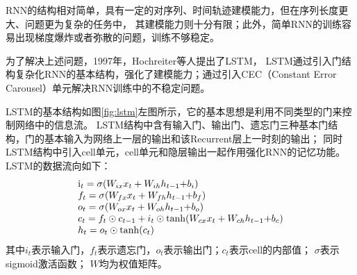 RNN的结构相对简单，具有一定的对序列、时间轨迹建模能力，但在序列长度更大、问题更为复杂的任务中，
其建模能力则十分有限；此外，简单RNN的训练容易出现梯度爆炸或者弥散的问题，训练不够稳定。

为了解决上述问题，1997年，Hochreiter等人提出了LSTM，
LSTM通过引入门结构复杂化RNN的基本结构，强化了建模能力；通过引入CEC（Constant Error Carousel）单元解决RNN训练中的不稳定问题。


LSTM的基本结构如图\ref{fig:lstm}左图所示，它的基本思想是利用不同类型的门来控制网络中的信息流。
LSTM结构中含有输入门、输出门、遗忘门三种基本门结构，门的基本输入为网络上一层的输出和该Recurrent层上一时刻的输出；
同时LSTM结构中引入cell单元，cell单元和隐层输出一起作用强化RNN的记忆功能。
LSTM的数据流向如下：
\begin{equation}
\begin{array}{l}
{{\rm{i}}_t} = \sigma ({W_{ix}}{x_t} + {W_{ih}}{h_{t - 1}}{\rm{ + }}{b_i})\\
{f_t} = \sigma ({W_{fx}}{x_t} + {W_{fh}}{h_{t - 1}}{\rm{ + }}{b_f})\\
{o_t} = \sigma ({W_{ox}}{x_t} + {W_{oh}}{h_{t - 1}}{\rm{ + }}{b_o})\\
{c_t} = {f_t} \odot {c_{t - 1}} + {i_t} \odot \tanh ({W_{cx}}{x_t} + {W_{ch}}{h_{t - 1}}{\rm{ + }}{b_c})\\
{h_t} = {o_t} \odot \tanh ({c_t})
\end{array}
\end{equation}
其中$i_t$表示输入门，$f_t$表示遗忘门，$o_t$表示输出门；$c_t$表示cell的内部值；
$\sigma$表示sigmoid激活函数；
$W$均为权值矩阵。


